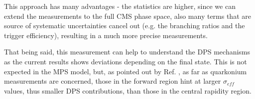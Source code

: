 This approach has many advantages - the statistics are higher, since we can extend the measurements to the full CMS phase space, also many terms that are source of systematic uncertainties cancel out (e.g. the branching ratios and the trigger efficiency), resulting in a much more precise measurements.

That being said, this measurement can help to understand the DPS mechanisms as the current results shows deviations depending on the final state. This is not expected in the MPS model, but, as pointed out by Ref. \cite{Lansberg:2019adr}, as far as quarkonium measurements are concerned, those in the forward region hint at larger $\sigma_{eff}$ values, thus smaller DPS contributions, than those in the central rapidity region.
